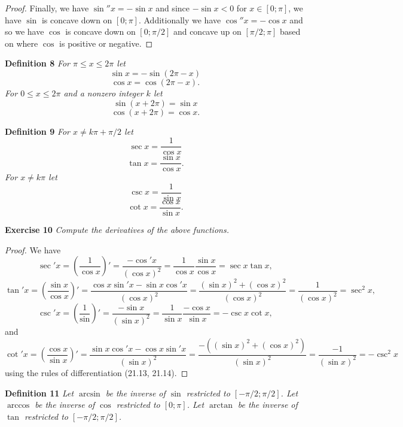 \documentclass{article}
\begin{document}
\begin{flushleft}
\begin{proof}
Finally, we have $\sin'' x = -\sin x$ and since $- \sin x < 0$ for $x \in [0;\pi]$, we have $\sin$ is concave down on $[0;\pi]$. Additionally we have $\cos'' x = -\cos x$ and so we have $\cos$ is concave down on $[0;\pi/2]$ and concave up on $[\pi/2; \pi]$ based on where $\cos$ is positive or negative.
\end{proof}

\textbf{Definition 8}
\textsl{For $\pi \leq x \leq 2 \pi$ let
\[
\sin x = - \sin (2\pi - x)
\]
\[
\cos x = \cos (2\pi - x).
\]
For $0 \leq x \leq 2\pi$ and a nonzero integer $k$ let
\[
\sin (x + 2\pi) = \sin x
\]
\[
\cos (x + 2\pi) = \cos x.
\]}

\textbf{Definition 9}
\textsl{For $x \neq k \pi + \pi/2$ let
\[
\sec x = \frac{1}{\cos x}
\]
\[
\tan x = \frac{\sin x}{\cos x}.
\]
For $x \neq k \pi$ let
\[
\csc x = \frac{1}{\sin x}
\]
\[
\cot x = \frac{\cos x}{\sin x}.
\]}

\textbf{Exercise 10}
\textsl{Compute the derivatives of the above functions.}
\begin{proof}
We have
\[
\sec' x = \left ( \frac{1}{\cos x} \right )' = \frac{-\cos' x}{(\cos x)^2} = \frac{1}{\cos x} \frac{\sin x}{\cos x} = \sec x \tan x,
\]
\[
\tan' x = \left ( \frac{\sin x}{\cos x} \right )' = \frac{\cos x \sin' x - \sin x \cos' x}{(\cos x)^2} = \frac{(\sin x)^2 + (\cos x)^2}{(\cos x)^2} = \frac{1}{(\cos x)^2} = \sec^2 x,
\]
\[
\csc' x = \left ( \frac{1}{\sin} \right )' = \frac{-\sin x}{(\sin x)^2} = \frac{1}{\sin x} \frac{-\cos x}{\sin x} = -\csc x \cot x,
\]
and
\[
\cot' x = \left ( \frac{\cos x}{\sin x} \right )' = \frac{\sin x \cos' x - \cos x \sin' x}{(\sin x)^2} = \frac{-((\sin x)^2 + (\cos x)^2)}{(\sin x)^2} = \frac{-1}{(\sin x)^2} = -\csc^2 x
\]
using the rules of differentiation (21.13, 21.14).
\end{proof}

\textbf{Definition 11}
\textsl{Let $\arcsin$ be the inverse of $\sin$ restricted to $[-\pi/2; \pi/2]$. Let $\arccos$ be the inverse of $\cos$ restricted to $[0; \pi]$. Let $\arctan$ be the inverse of $\tan$ restricted to $[-\pi/2; \pi/2]$.}\newline


\end{flushleft}
\end{document}

